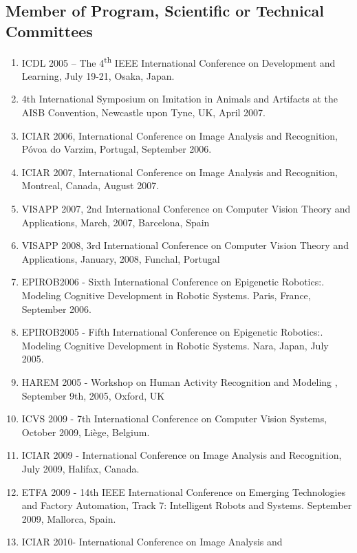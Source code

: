 \subsection{Member of Program, Scientific or Technical
Committees}\label{member-of-program-scientific-or-technical-committees}

\begin{enumerate}
\def\labelenumi{\arabic{enumi}.}
\item
  ICDL 2005 -- The 4\textsuperscript{th} IEEE International Conference
  on Development and Learning, July 19-21, Osaka, Japan.
\item
  4th International Symposium on Imitation in Animals and Artifacts at
  the AISB Convention, Newcastle upon Tyne, UK, April
  2007.
\item
  ICIAR 2006, International Conference on Image Analysis and
  Recognition, Póvoa do Varzim, Portugal, September 2006.
\item
  ICIAR 2007, International Conference on Image Analysis and
  Recognition, Montreal, Canada, August 2007.
\item
  VISAPP 2007, 2nd International Conference on Computer Vision Theory
  and Applications, March, 2007, Barcelona, Spain
\item
  VISAPP 2008, 3rd International Conference on Computer Vision Theory
  and Applications, January, 2008, Funchal, Portugal
\item
  EPIROB2006 - Sixth International Conference on Epigenetic Robotics:.
  Modeling Cognitive Development in Robotic Systems. Paris, France,
  September 2006.
\item
  EPIROB2005 - Fifth International Conference on Epigenetic Robotics:.
  Modeling Cognitive Development in Robotic Systems. Nara, Japan, July
  2005.
\item
  HAREM 2005 - Workshop on Human Activity Recognition and Modeling ,
  September 9th, 2005, Oxford, UK
\item
  ICVS 2009 - 7th International Conference on Computer Vision Systems,
  October 2009, Liège, Belgium.
\item
  ICIAR 2009 - International Conference on Image Analysis and
  Recognition, July 2009, Halifax, Canada.
\item
  ETFA 2009 - 14th IEEE International Conference on Emerging
  Technologies and Factory Automation, Track 7: Intelligent Robots and
  Systems. September 2009, Mallorca, Spain.
\item
  ICIAR 2010- International Conference on Image Analysis and

\end{enumerate}
